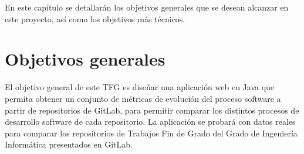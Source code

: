 
En este capítulo se detallarán los objetivos generales que se desean alcanzar en este proyecto, así como los objetivos más técnicos.

\section{Objetivos generales}
El objetivo general de este TFG es diseñar una aplicación web en Java que permita obtener un conjunto de métricas de evolución del proceso software \citep{ratzinger_space:_2007} a partir de repositorios de GitLab, para permitir comparar los distintos procesos de desarrollo software de cada repositorio.
La aplicación se probará con datos reales para comparar los repositorios de Trabajos Fin de Grado del Grado de Ingeniería Informática presentados en GitLab.
   
